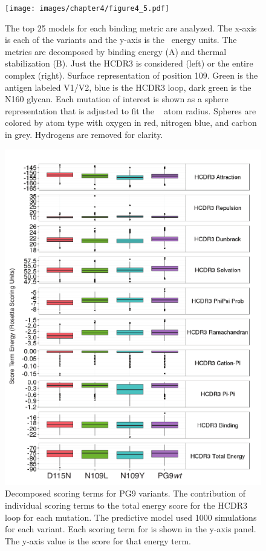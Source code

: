 \begin{figure}[!t]
   \centering
   \texttt{[image: images/chapter4/figure4\_5.pdf]} %
   \caption[Predictive Models of PG9 Variants that Enhanced Binding]{The top 25 models for each binding metric are analyzed. The x-axis is each of the variants and the y-axis is the \rosetta~energy units. The metrics are decomposed by binding energy (A) and thermal stabilization (B). Just the HCDR3 is considered (left) or the entire complex (right). Surface representation of position 109. Green is the antigen labeled V1/V2, blue is the HCDR3 loop, dark green is the N160 glycan. Each mutation of interest is shown as a sphere representation that is adjusted to fit the \rosetta~ atom radius. Spheres are colored by atom type with oxygen in red, nitrogen blue, and carbon in grey. Hydrogens are removed for clarity.}
   \label{fig:figure4_5}
\end{figure}


\begin{figure}[!t]
   \centering
   \includegraphics[scale=1.4]{images/chapter4/figure4_6.pdf} %
   \caption[Decomposed Scoring Terms for PG9 Variants]{Decomposed scoring terms for PG9 variants. The contribution of individual scoring terms to the total energy score for the HCDR3 loop for each mutation. The predictive model used 1000 simulations for each variant. Each scoring term for \rosetta is shown in the y-axis panel. The y-axis value is the score for that energy term.}
   \label{fig:figure4_6}
\end{figure}



